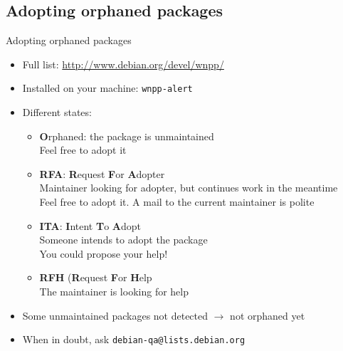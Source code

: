 \documentclass[10pt,final,handout]{beamer}
\newcommand{\arr}{\textbf{$\rightarrow$}\xspace}
\begin{document}
\subsection{Adopting orphaned packages}
\begin{frame}{Adopting orphaned packages}
\begin{itemize}
	\item Full list: \url{http://www.debian.org/devel/wnpp/}
	\item Installed on your machine: \texttt{wnpp-alert}
	\item Different states:
	\begin{itemize}
		\item \textbf{O}rphaned: the package is unmaintained\\
			Feel free to adopt it
		\item \textbf{RFA}: \textbf{R}equest \textbf{F}or \textbf{A}dopter\\
			Maintainer looking for adopter, but continues work in the meantime\\
			Feel free to adopt it. A mail to the current maintainer is polite
		\item \textbf{ITA}: \textbf{I}ntent \textbf{T}o \textbf{A}dopt\\
			Someone intends to adopt the package\\
			You could propose your help!
		\item \textbf{RFH} (\textbf{R}equest \textbf{F}or \textbf{H}elp\\
			The maintainer is looking for help
	\end{itemize}
	\item Some unmaintained packages not detected \arr not orphaned yet
	\item When in doubt, ask \texttt{debian-qa@lists.debian.org}
	\end{itemize}
\end{frame}
\end{document}
